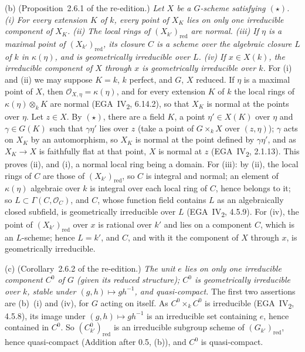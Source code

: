 (b) (Proposition~2.6.1 of the re-edition.) \emph{Let \(X\) be a \(G\)-scheme satisfying \((\star)\).
\textup{(i)} For every extension \(K\) of \(k\), every point of \(X_K\) lies on only one irreducible
component of \(X_K\). \textup{(ii)} The local rings of \((X_{k'})_{\mathrm{red}}\) are normal.
\textup{(iii)} If \(\eta\) is a maximal point of \((X_{k'})_{\mathrm{red}}\), its closure \(C\) is a
scheme over the algebraic closure \(L\) of \(k\) in \(\kappa(\eta)\), and is geometrically
irreducible over \(L\). \textup{(iv)} If \(x\in X(k)\), the irreducible component of \(X\) through
\(x\) is geometrically irreducible over \(k\).} For (i) and (ii) we may suppose \(K=k\), \(k\)
perfect, and \(G\), \(X\) reduced. If \(\eta\) is a maximal point of \(X\), then
\(\mathcal O_{X,\eta}=\kappa(\eta)\), and for every extension \(K\) of \(k\) the local rings of
\(\kappa(\eta)\otimes_kK\) are normal (EGA~IV\textsubscript{2}, 6.14.2), so that \(X_K\) is normal at
the points over \(\eta\). Let \(z\in X\). By \((\star)\), there are a field \(K\), a point
\(\eta'\in X(K)\) over \(\eta\) and \(\gamma\in G(K)\) such that \(\gamma\eta'\) lies over \(z\) (take
a point of \(G\times_kX\) over \((z,\eta)\)); \(\gamma\) acts on \(X_K\) by an automorphism, so
\(X_K\) is normal at the point defined by \(\gamma\eta'\), and as \(X_K\to X\) is faithfully flat at
that point, \(X\) is normal at \(z\) (EGA~IV\textsubscript{2}, 2.1.13). This proves (ii), and (i), a
normal local ring being a domain. For (iii): by (ii), the local rings of \(C\) are those of
\((X_{k'})_{\mathrm{red}}\), so \(C\) is integral and normal; an element of \(\kappa(\eta)\) algebraic
over \(k\) is integral over each local ring of \(C\), hence belongs to it; so
\(L\subset\Gamma(C,\mathcal O_C)\), and \(C\), whose function field contains \(L\) as an algebraically
closed subfield, is geometrically irreducible over \(L\) (EGA~IV\textsubscript{2}, 4.5.9). For (iv),
the point of \((X_{k'})_{\mathrm{red}}\) over \(x\) is rational over \(k'\) and lies on a component
\(C\), which is an \(L\)-scheme; hence \(L=k'\), and \(C\), and with it the component of \(X\)
through \(x\), is geometrically irreducible.

(c) (Corollary~2.6.2 of the re-edition.) \emph{The unit \(e\) lies on only one irreducible component
\(C^0\) of \(G\) \textup{(}given its reduced structure\textup{)}; \(C^0\) is geometrically irreducible
over \(k\), stable under \((g,h)\mapsto gh^{-1}\), and quasi-compact.} The first two assertions are
(b)~(i) and (iv), for \(G\) acting on itself. As \(C^0\times_kC^0\) is irreducible
(EGA~IV\textsubscript{2}, 4.5.8), its image under \((g,h)\mapsto gh^{-1}\) is an irreducible set
containing \(e\), hence contained in \(C^0\). So \((C^0_{k'})_{\mathrm{red}}\) is an irreducible
subgroup scheme of \((G_{k'})_{\mathrm{red}}\), hence quasi-compact (Addition after 0.5, (b)), and
\(C^0\) is quasi-compact.

